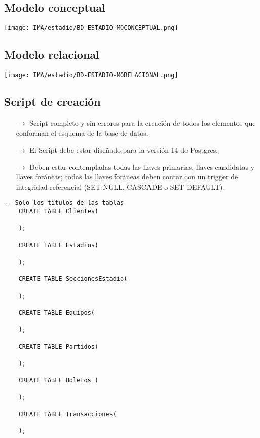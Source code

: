 \subsection{Modelo conceptual}
\begin{center}
    \texttt{[image: IMA/estadio/BD-ESTADIO-MOCONCEPTUAL.png]}
\end{center}


\subsection{Modelo relacional}
\begin{center}
    \texttt{[image: IMA/estadio/BD-ESTADIO-MORELACIONAL.png]}
\end{center}


\subsection{Script de creación}

\begin{itemize}
    \item[$\rightarrow$] Script completo y sin errores para la creación de todos los elementos que conforman el esquema
            de la base de datos.
    \item[$\rightarrow$] El Script debe estar diseñado para la versión 14 de Postgres.
    \item[$\rightarrow$] Deben estar contempladas todas las llaves primarias, llaves candidatas y llaves foráneas;
    todas las llaves foráneas deben contar con un trigger de integridad referencial (SET NULL,
    CASCADE o SET DEFAULT).
\end{itemize}


\begin{lstlisting}[caption={Tablas para la BdDatos}, label={lst:sql_estadios}]
    -- Solo los titulos de las tablas    
    CREATE TABLE Clientes(

    );

    CREATE TABLE Estadios(

    );

    CREATE TABLE SeccionesEstadio(

    );

    CREATE TABLE Equipos(

    );

    CREATE TABLE Partidos(

    );

    CREATE TABLE Boletos (

    );

    CREATE TABLE Transacciones(

    );
\end{lstlisting}

